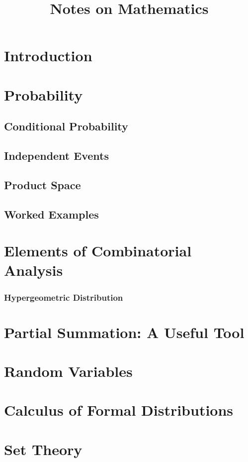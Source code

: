 \documentclass{article}
\title{Notes on Mathematics}
\begin{document}
\maketitle
\tableofcontents

\section{Introduction}


\section{Probability}

\subsection{Conditional Probability}

\subsection{Independent Events}

\subsection{Product Space} 


\subsection{Worked Examples}


\section{Elements of Combinatorial Analysis}

\subsubsection{Hypergeometric Distribution}

\section[Partial Summation]{Partial Summation: A Useful Tool}


\section{Random Variables}


\section{Calculus of Formal Distributions}


\vfill\eject
\appendix
\section{Set Theory}


\end{document}
